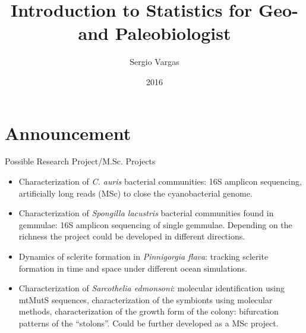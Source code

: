 \documentclass{beamer}
\title[Geostatistics]{Introduction to Statistics for Geo- and Paleobiologist}
\author{Sergio Vargas}
\institute{Dept. Earth \& Environmental Sciences}
\date{2016}
\begin{document}
\begin{frame}
  \titlepage
\end{frame}


\section{Announcement}

\begin{frame}{Possible Research Project/M.Sc. Projects}

\begin{itemize}
  \item Characterization of \emph{C. auris} bacterial communities: 16S amplicon sequencing, artificially long reads (MSc) to close the cyanobacterial genome.
  \pause
  \item Characterization of \emph{Spongilla lacustris} bacterial communities found in gemmulae: 16S amplicon sequencing of single gemmulae. Depending on the richness the project could be developed in different directions.
  \pause
  \item Dynamics of sclerite formation in \emph{Pinnigorgia flava}: tracking sclerite formation in time and space under different ocean simulations.
  \pause
  \item Characterization of \emph{Sarcothelia edmonsoni}: molecular identification using mtMutS sequences, characterization of the symbionts using molecular methods, characterization of the growth form of the colony: bifurcation patterns of the ``stolons''. Could be further developed as a MSc project.
\end{itemize}
\end{frame}
\end{document}
